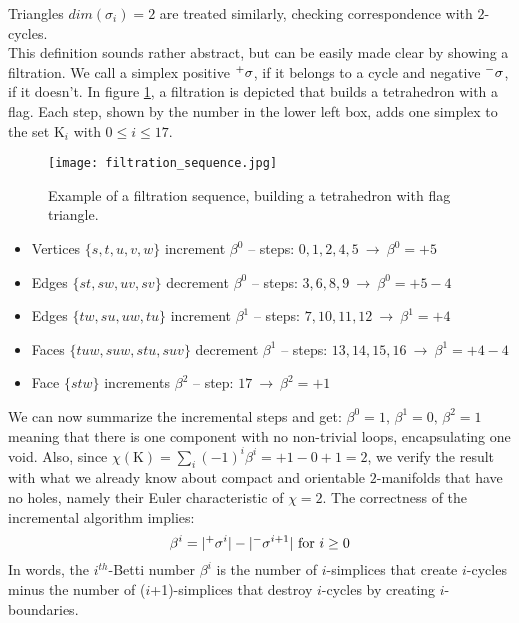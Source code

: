 Triangles $dim(\sigma_{i})=2$ are treated similarly, checking correspondence with $2$-cycles.\\
This definition sounds rather abstract, but can be easily made clear by showing a filtration.
We call a simplex positive $\Prefix^{+}{\sigma}$, if it belongs to a cycle and negative $\Prefix^{-}{\sigma}$, if it doesn't.
In figure \ref{fig:filtration_sequence}, a filtration is depicted that builds a tetrahedron with a flag.
Each step, shown by the number in the lower left box, adds one simplex to the set $\mathrm{K}_{i}$ with $0 \leq i \leq 17$.
\begin{figure}[htb]
\centering
\texttt{[image: filtration\_sequence.jpg]}
\caption{Example of a filtration sequence, building a tetrahedron with flag triangle.}
\label{fig:filtration_sequence}
\end{figure} \vspace{-2ex}
\begin{itemize}
  \setlength{\itemsep}{0cm}%
  \setlength{\parskip}{0cm}%
	\item Vertices $\{s, t, u, v, w\}$ increment $\beta^{0}$ -- steps: $0, 1, 2, 4, 5 ~\longrightarrow~ \beta^{0} = +5$
	\item Edges $\{st, sw, uv, sv\}$ decrement $\beta^{0}$ -- steps: $3, 6, 8, 9 ~\longrightarrow ~\beta^{0} = +5-4$
	\item Edges $\{tw, su, uw, tu\}$ increment $\beta^{1}$ -- steps: $7, 10, 11, 12 ~\longrightarrow ~\beta^{1} = +4$
	\item Faces $\{tuw, suw, stu, suv\}$ decrement $\beta^{1}$ -- steps: $13, 14, 15, 16 ~\longrightarrow ~\beta^{1} = +4-4$
	\item Face $\{stw\}$ increments $\beta^{2}$ -- step: $17 ~\longrightarrow ~\beta^{2} = +1$
\end{itemize}
We can now summarize the incremental steps and get: $\beta^{0} = 1, \,\beta^{1} = 0, \,\beta^{2} = 1$ meaning that there is one component with no non-trivial loops, encapsulating one void.
Also, since $\chi(\mathrm{K}) = \sum_{i} (-1)^{i}\beta^{i} = +1 -0 +1 = 2$, we verify the result with what we already know about compact and orientable $2$-manifolds that have no holes, namely their Euler characteristic of $\chi = 2$.
The correctness of the incremental algorithm implies:
\begin{equation} \label{eq:incremental_betti}
	\beta^{i} = |\Prefix^{+}{\sigma^{i}}|-|\Prefix^{-}{\sigma^{i+1}}| \text{ for } i \geq 0
\end{equation}
In words, the $i^{th}$-Betti number $\beta^{i}$ is the number of $i$-simplices that create $i$-cycles minus the number of ($i$+1)-simplices that destroy $i$-cycles by creating $i$-boundaries.


